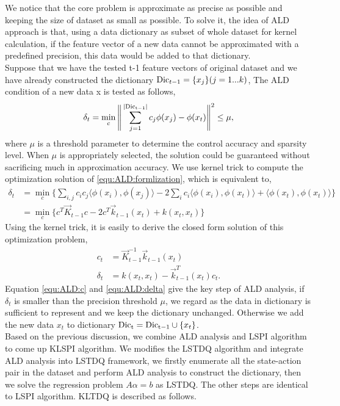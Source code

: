 We notice that the core problem is approximate as precise as possible and keeping the size of dataset as small as possible. To solve it, the idea of ALD approach  is that, using a data dictionary as subset of whole dataset for kernel calculation, if the feature vector of a new data cannot be approximated with a predefined precision, this data would be added to that dictionary.\\
Suppose that we have the tested t-1 feature vectors of original dataset and we have already constructed the dictionary ${\rm Dic}_{t-1} = \{  x_j \} (j =  1...k)$, The ALD condition of a new data x is tested as follows,
\begin{align}
\delta_t = \min_c \Bigg \Vert \sum_{j=1}^{\vert {\rm Dic_{t-1}} \vert} c_j\phi(x_j) - \phi(x_t) \Bigg \Vert^2 \le \mu, \label{equ:ALD:formlization}
\end{align}
where $\mu$ is a threshold parameter to determine the control accuracy and sparsity level. When $\mu$ is appropriately selected, the solution could be guaranteed without sacrificing much in approximation accuracy. We use kernel trick to compute the optimization solution of \eqref{equ:ALD:formlization}, which is equivalent to,
\begin{align}
\delta_t &= \min_c \bigg \{  \sum_{i,j} c_i c_j \langle \phi(x_i), \phi(x_j) \rangle - 2\sum_i c_i \langle \phi(x_i), \phi(x_t) \rangle + \langle \phi(x_t), \phi(x_t) \rangle  \bigg \} \nonumber  \\
&= \min_c \{ c^T \vec K_{t-1}c - 2c^T \vec k_{t-1}(x_t) + k(x_t, x_t)  \} \nonumber
\end{align}
Using the kernel trick, it is easily to derive the closed form solution of this optimization problem,
\begin{align}
 c_t &= \vec K_{t-1}^{-1} \vec k_{t-1}(x_t) \label{equ:ALD:c} \\
\delta_t &=  k(x_t, x_t) - \vec k_{t-1}^T(x_t) c_t. \label{equ:ALD:delta}
\end{align}
Equation \eqref{equ:ALD:c} and \eqref{equ:ALD:delta} give the key step of ALD analysis, if $\delta_t$ is smaller than the precision threshold $\mu$, we regard as the data in dictionary is sufficient to represent and we keep the dictionary unchanged. Otherwise we add the new data $x_t$ to dictionary  $ {\rm Dic_t = Dic_{t-1} }\cup \{x_t\} $. \\
Based on the previous discussion, we combine ALD analysis and LSPI algorithm to come up KLSPI algorithm. We modifies the LSTDQ algorithm and integrate ALD analysis into LSTDQ  framework, we firstly enumerate all the state-action pair in the dataset and perform ALD analysis to construct the dictionary, then we solve the regression problem $ A \alpha = b$ as LSTDQ. The other steps are identical to LSPI algorithm. KLTDQ is described  as follows.\\



